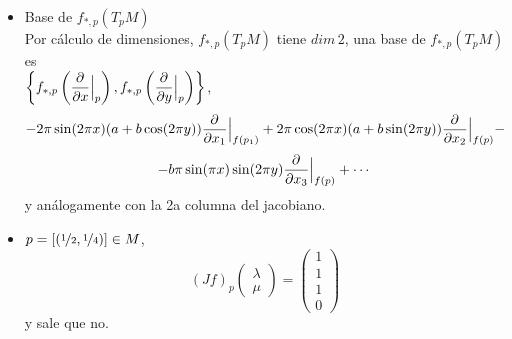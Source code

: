 \begin{sol}
\begin{itemize}
$$\begin{pmatrix}
        \end{pmatrix}$$
        que es la misma para ambas lecturas en coordenadas. As\'i, un menor es
        $$\Delta_{12} = 4\pi^2b (a+b\cos 2\pi y) \sin(2\pi y) \cancelto{1}{\begin{vmatrix}
            -\sin(2\pi x) & -\cos(2\pi x) \\ \cos(2\pi x) & -\sin(2\pi x)
        \end{vmatrix}} = 4\pi^2b (a+b\cos 2\pi y) \sin(2\pi y)$$
        y dado que $4\pi^2 b> 0 $ y de la misma forma $ (a+b\cos 2\pi y) > 0$, de forma que el determinante es 0 si $\sin(2\pi y) = 0 \iff y =\nicefrac{1}{2}$, pues $y \in (0,1)$. As\'i que $f$ es inmersi\'on en $[x,y] \in M, \, \forall y \neq \nicefrac{1}{2}$. 

        El caso en que $y=\nicefrac{1}{2}$, 
        $$(Jf)_{p} = \begin{pmatrix}
            -2\pi \sin(2\pi x)(a-b) & \\ 2\pi \cos(2\pi x)(a-b) & \\ 0 & -2\pi b \cos(\pi x)\\ 0 & 2\pi b \sin(\pi x) 
        \end{pmatrix}$$
        de forma que 
        $$\Delta_{13}= 4\pi^2b \sin(2\pi x)(a-b)(\cos(\pi x)) = 0 \iff \cos(\pi x)=0 = \sin(2\pi x) \iff  \begin{cases}
            x=\nicefrac{1}{2} \\ x=0
        \end{cases}$$
        y por \'ultimo, $\Delta_{23} = 4\pi^2 b\cos(2\pi x)(a-b) \cos(\pi x) = 0 (x=\nicefrac{1}{2}, \nicefrac{1}{4}, \nicefrac{3}{4})$, $\Delta_{24} =  4\pi^2 b\cos(2\pi x)(a-b) \sin(\pi x) = 0 (x=0, \nicefrac{3}{4})$, de forma que los dos \'ultimos no pueden ocurrir a la vez. En conclusi\'on, en todo punto el jacobiano tiene rango m\'aximo $\forall p$ y por tanto $f$ es inmersi\'on. 
        \item Base de $f_{*,p}(T_pM)$ \\ Por c\'alculo de dimensiones, $f_{*,p}(T_pM)$ tiene $dim \, 2$, una base de $f_{*,p}(T_pM)$ es \\ $\left\{ f_{*,p}\left(\dfrac{\partial^{} }{\partial x}\Big|_p\right), f_{*,p}\left(\dfrac{\partial^{} }{\partial y}\Big|_p\right)\right\}$,
        $$-2\pi \sin(2\pi x)(a+b\cos(2\pi y )) \dfrac{\partial^{} }{\partial x_1}\Big|_{f(p_1)} + 2\pi \cos(2\pi x) (a+b\sin(2\pi y)) \dfrac{\partial^{} }{\partial x_2}\Big|_{f(p)} - $$
        $$-b \pi \sin (\pi x) \sin(2\pi y) \dfrac{\partial^{} }{\partial x_3}\Big|_{f(p)} + \cdots$$
        y an\'alogamente con la 2a columna del jacobiano.

        \item $p=[(\nicefrac{1}{2}, \nicefrac{1}{4})] \in M$,
        $$(Jf)_p \begin{pmatrix}
            \lambda \\ \mu
        \end{pmatrix} = \begin{pmatrix}
            1 \\ 1 \\ 1 \\ 0
        \end{pmatrix}$$
        y sale que no.
    \end{itemize} 
\end{sol}
